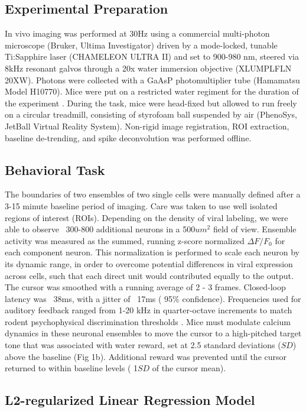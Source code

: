 \documentclass[letterpaper, 10 pt, conference]{ieeeconf}  %
\begin{document}
\subsection{Experimental Preparation}
In vivo imaging was performed at 30Hz using a commercial multi-photon microscope (Bruker, Ultima Investigator) driven by a mode-locked, tunable Ti:Sapphire laser (CHAMELEON ULTRA II) and set to 900-980 nm, steered via 8kHz resonant galvos through a 20x water immersion objective (XLUMPLFLN 20XW). Photons were collected with a GaAsP photomultiplier tube (Hamamatsu Model H10770). Mice were put on a restricted water regiment for the duration of the experiment \cite{Guo2014-db}. During the task, mice were head-fixed but allowed to run freely on a circular treadmill,  consisting of styrofoam ball suspended by air (PhenoSys, JetBall Virtual Reality System). Non-rigid image registration, ROI extraction, baseline de-trending, and spike deconvolution was performed offline. \cite{Pnevmatikakis2017-ch,Pnevmatikakis2016-bg}



\subsection{Behavioral Task}
The boundaries of two ensembles of two single cells were manually defined after a 3-15 minute baseline period of imaging. Care was taken to use well isolated regions of interest (ROIs).   Depending on the density of viral labeling, we were able to observe ~300-800 additional neurons in a 500$um^{2}$ field of view. Ensemble activity was measured as the summed, running z-score normalized $\Delta F/F_{0}$ for each component neuron. This normalization is performed  to scale each neuron by its dynamic range, in order to overcome potential differences in viral expression across cells, such that each direct unit would contributed equally to the output. The cursor was smoothed with a running average of 2 - 3 frames. Closed-loop latency was ~38ms, with a jitter  of ~17ms ( 95\% confidence). Frequencies used for auditory feedback ranged from 1-20 kHz in quarter-octave increments to match rodent psychophysical discrimination thresholds \cite{Clancy2014-ju}. Mice must modulate calcium dynamics in these neuronal ensembles to move the cursor to a high-pitched target tone that was associated with water reward, set at 2.5 standard deviations ($SD$) above the baseline (Fig 1b). Additional reward was prevented until the cursor returned to within baseline levels ( 1$SD$ of the cursor mean). 
\subsection{L2-regularized Linear Regression Model }
\end{document}
